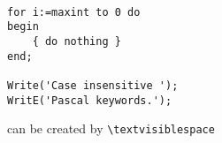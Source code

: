 \documentclass{article}
\begin{document}
\begin{lstlisting}

for i:=maxint to 0 do
begin
    { do nothing }
end;

Write('Case insensitive ');
WritE('Pascal keywords.');
\end{lstlisting}

\noindent \textvisiblespace{} can be created by \texttt{\textbackslash{}textvisiblespace}
\end{document}
